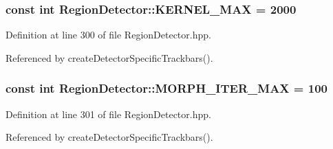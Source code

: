 \hypertarget{classmultiscale_1_1analysis_1_1RegionDetector_aa988e3458f774c489e03e3f8bd0db1ed}{
\subsubsection[{\-K\-E\-R\-N\-E\-L\-\_\-\-M\-A\-X}]{\setlength{\rightskip}{0pt plus 5cm}const int {\bf \-Region\-Detector\-::\-K\-E\-R\-N\-E\-L\-\_\-\-M\-A\-X} = 2000}}\label{classmultiscale_1_1analysis_1_1RegionDetector_aa988e3458f774c489e03e3f8bd0db1ed}


\-Definition at line 300 of file \-Region\-Detector.\-hpp.



\-Referenced by create\-Detector\-Specific\-Trackbars().

\hypertarget{classmultiscale_1_1analysis_1_1RegionDetector_adeaa40a86b09bad2530bf179cbb4e602}{
\subsubsection[{\-M\-O\-R\-P\-H\-\_\-\-I\-T\-E\-R\-\_\-\-M\-A\-X}]{\setlength{\rightskip}{0pt plus 5cm}const int {\bf \-Region\-Detector\-::\-M\-O\-R\-P\-H\-\_\-\-I\-T\-E\-R\-\_\-\-M\-A\-X} = 100}}\label{classmultiscale_1_1analysis_1_1RegionDetector_adeaa40a86b09bad2530bf179cbb4e602}


\-Definition at line 301 of file \-Region\-Detector.\-hpp.



\-Referenced by create\-Detector\-Specific\-Trackbars().


